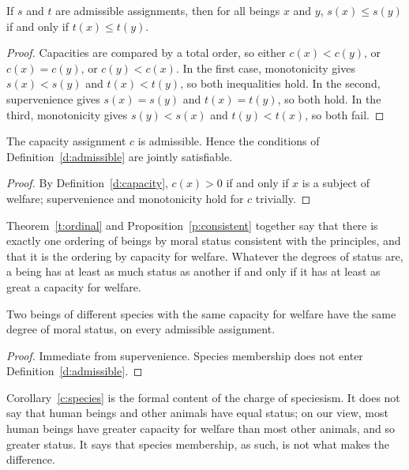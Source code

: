 \documentclass{situationist-preprint}
\begin{document}
\begin{theorem}\label{t:ordinal}
If $s$ and $t$ are admissible assignments, then for all beings $x$ and $y$, $s(x) \le s(y)$ if and only if $t(x) \le t(y)$.
\end{theorem}

\begin{proof}
Capacities are compared by a total order, so either $c(x) < c(y)$, or $c(x) = c(y)$, or $c(y) < c(x)$. In the first case, monotonicity gives $s(x) < s(y)$ and $t(x) < t(y)$, so both inequalities hold. In the second, supervenience gives $s(x) = s(y)$ and $t(x) = t(y)$, so both hold. In the third, monotonicity gives $s(y) < s(x)$ and $t(y) < t(x)$, so both fail.
\end{proof}

\begin{proposition}[Consistency]\label{p:consistent}
The capacity assignment $c$ is admissible. Hence the conditions of Definition~\ref{d:admissible} are jointly satisfiable.
\end{proposition}

\begin{proof}
By Definition~\ref{d:capacity}, $c(x) > 0$ if and only if $x$ is a subject of welfare; supervenience and monotonicity hold for $c$ trivially.
\end{proof}

Theorem~\ref{t:ordinal} and Proposition~\ref{p:consistent} together say that there is exactly one ordering of beings by moral status consistent with the principles, and that it is the ordering by capacity for welfare. Whatever the degrees of status are, a being has at least as much status as another if and only if it has at least as great a capacity for welfare.

\begin{corollary}\label{c:species}
Two beings of different species with the same capacity for welfare have the same degree of moral status, on every admissible assignment.
\end{corollary}

\begin{proof}
Immediate from supervenience. Species membership does not enter Definition~\ref{d:admissible}.
\end{proof}

Corollary~\ref{c:species} is the formal content of the charge of speciesism. It does not say that human beings and other animals have equal status; on our view, most human beings have greater capacity for welfare than most other animals, and so greater status. It says that species membership, as such, is not what makes the difference.
\end{document}
